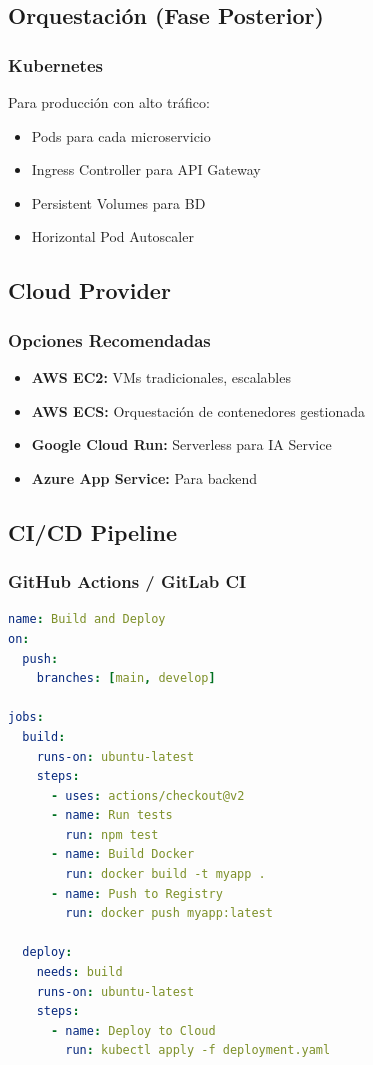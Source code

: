 \documentclass[12pt,a4paper,spanish]{article}
\begin{document}
\subsection{Orquestación (Fase Posterior)}

\subsubsection{Kubernetes}

Para producción con alto tráfico:

\begin{itemize}
    \item Pods para cada microservicio
    \item Ingress Controller para API Gateway
    \item Persistent Volumes para BD
    \item Horizontal Pod Autoscaler
\end{itemize}

\subsection{Cloud Provider}

\subsubsection{Opciones Recomendadas}

\begin{itemize}
    \item \textbf{AWS EC2:} VMs tradicionales, escalables
    \item \textbf{AWS ECS:} Orquestación de contenedores gestionada
    \item \textbf{Google Cloud Run:} Serverless para IA Service
    \item \textbf{Azure App Service:} Para backend
\end{itemize}

\subsection{CI/CD Pipeline}

\subsubsection{GitHub Actions / GitLab CI}

\begin{lstlisting}[language=yaml]
name: Build and Deploy
on:
  push:
    branches: [main, develop]

jobs:
  build:
    runs-on: ubuntu-latest
    steps:
      - uses: actions/checkout@v2
      - name: Run tests
        run: npm test
      - name: Build Docker
        run: docker build -t myapp .
      - name: Push to Registry
        run: docker push myapp:latest

  deploy:
    needs: build
    runs-on: ubuntu-latest
    steps:
      - name: Deploy to Cloud
        run: kubectl apply -f deployment.yaml
\end{lstlisting}
\end{document}
